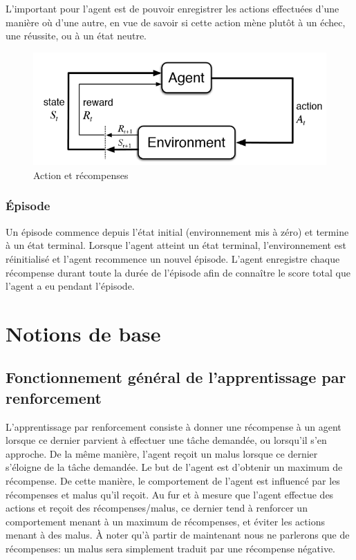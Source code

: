 \documentclass[11pt,a4paper]{report}
\begin{document}
    \par L'important pour l'agent est de pouvoir enregistrer les actions effectuées d'une manière où d'une autre, en vue de savoir si cette action mène plutôt à un échec, une réussite, ou à un état neutre. 
    
    \begin{figure}[!h]
    \center
    \includegraphics[scale=0.5]{ressources/shema_agent_environnement.png}
    \caption{Action et récompenses}
    \end{figure} 
    
  \subsubsection{Épisode}
  
    \par Un épisode commence depuis l'état initial (environnement mis à zéro) et termine à un état terminal. Lorsque l'agent atteint un état terminal, l'environnement est réinitialisé et l'agent recommence un nouvel épisode. L'agent enregistre chaque récompense durant toute la durée de l'épisode afin de connaître le score total que l'agent a eu pendant l'épisode.
    
  \section{Notions de base}
  
  \subsection{Fonctionnement général de l'apprentissage par renforcement}
  
    \par L'apprentissage par renforcement consiste à donner une récompense à un agent lorsque ce dernier parvient à effectuer une tâche demandée, ou lorsqu'il s'en approche. De la même manière, l'agent reçoit un malus lorsque ce dernier s'éloigne de la tâche demandée. Le but de l'agent est d'obtenir un maximum de récompense. De cette manière, le comportement de l'agent est influencé par les récompenses et malus qu'il reçoit. Au fur et à mesure que l'agent effectue des actions et reçoit des récompenses/malus, ce dernier tend à renforcer un comportement menant à un maximum de récompenses, et éviter les actions menant à des malus. À noter qu'à partir de maintenant nous ne parlerons que de récompenses: un malus sera simplement traduit par une récompense négative. 
  
\end{document}
